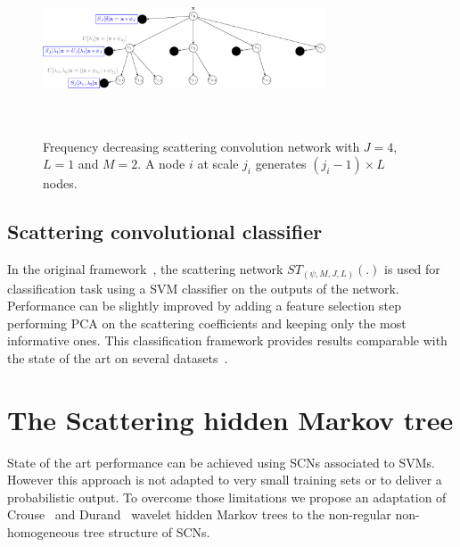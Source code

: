 \documentclass{article}
\begin{document}
    \begin{figure}
      \begin{center}
        \includegraphics[width=3.3in, height=2in, keepaspectratio]{ST_freqDec_crop.pdf}
        \caption[Frequency decreasing scattering convolution network.]{\centering  Frequency decreasing scattering convolution network with $J=4$, $L=1$ and $M=2$. A node $i$ at scale $j_{i}$ generates $(j_{i}-1) \times L$ nodes. }
        \label{fig:SCN 2}
      \end{center}
      \vspace{-15pt}
    \end{figure}
    
  \subsection{Scattering convolutional classifier}
    \label{subsec:SCN/SCC}
    In the original framework~\cite{bruna2013scattering}, the scattering network $ST_{(\psi, M,J,L)}(.)$ is used for classification task using a SVM classifier on the outputs of the network. Performance can be slightly improved by adding a feature selection step performing PCA on the scattering coefficients and keeping only the most informative ones. This classification framework provides results comparable with the state of the art on several datasets~\cite{bruna2010classification}.

\section{The Scattering hidden Markov tree}
  \label{sec:SCHMT}
  State of the art performance can be achieved using SCNs associated to SVMs. However this approach is not adapted to very small training sets or to deliver a probabilistic output. To overcome those limitations we propose an adaptation of Crouse~\cite{crouse1998wavelet} and Durand~\cite{durand2004computational} wavelet hidden Markov trees to the non-regular non-homogeneous tree structure of SCNs.
  
\end{document}
